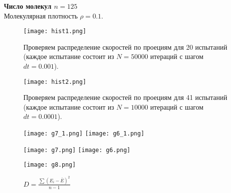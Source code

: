 \documentclass[a4paper,12pt]{article}
\author{Sofia B. Lopez}
\title{}
\begin{document}
\textbf{Число молекул \(n=125\)}\\
Молекулярная плотность $\rho=0.1$.
\begin{center}
  \begin{figure}[htb]
    \texttt{[image: hist1.png]}
    \caption{Проверяем распределение скоростей по проециям для 20 испытаний (каждое испытание состоит из \(N=50000\) итераций с шагом \(dt=0.001\)).}
  \end{figure}
  \begin{figure}[htb]
    \texttt{[image: hist2.png]}
    \caption{Проверяем распределение скоростей по проециям для 41 испытаний (каждое испытание состоит из \(N=10000\) итераций с шагом \(dt=0.0001\)).}
  \end{figure}
\end{center}
\begin{center}
\end{center}
\begin{center}
  \begin{figure}[htb]
    \texttt{[image: g7\_1.png]}
    \texttt{[image: g6\_1.png]}
  \end{figure}
\end{center}
\begin{center}
  \begin{figure}[htb]
    \texttt{[image: g7.png]}
    \texttt{[image: g6.png]}
  \end{figure}
\end{center}
\begin{center}
  \begin{figure}[htb]
    \texttt{[image: g8.png]}
    \caption{\(D=\frac{\sum(E_i-\overline{E})^2}{n-1}\)}
  \end{figure}
\end{center}
\end{document}
